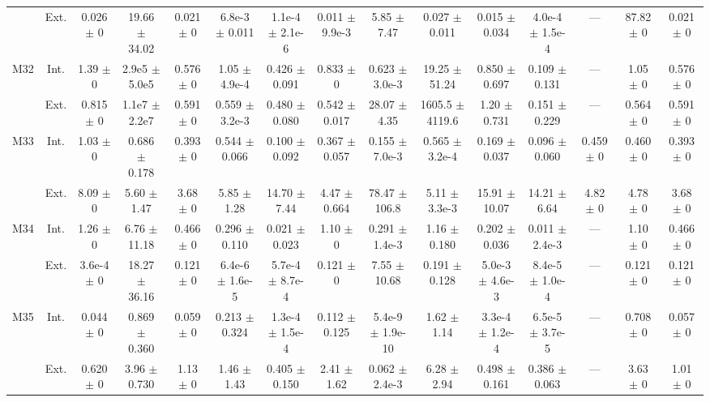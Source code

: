 \begin{table}[htbp]
{\begin{tabular}{@{}ccccccccccccccc@{}}
 & Ext. & 0.026 $\pm$ 0 & 19.66 $\pm$ 34.02 & 0.021 $\pm$ 0 & 6.8e-3 $\pm$ 0.011 & 1.1e-4 $\pm$ 2.1e-6 & 0.011 $\pm$ 9.9e-3 & 5.85 $\pm$ 7.47 & 0.027 $\pm$ 0.011 & 0.015 $\pm$ 0.034 & 4.0e-4 $\pm$ 1.5e-4 & --- & 87.82 $\pm$ 0 & 0.021 $\pm$ 0 \\
\cline{2-15}
\multirow{2}{*}{M32} & Int. & 1.39 $\pm$ 0 & 2.9e5 $\pm$ 5.0e5 & 0.576 $\pm$ 0 & 1.05 $\pm$ 4.9e-4 & 0.426 $\pm$ 0.091 & 0.833 $\pm$ 0 & 0.623 $\pm$ 3.0e-3 & 19.25 $\pm$ 51.24 & 0.850 $\pm$ 0.697 & 0.109 $\pm$ 0.131 & --- & 1.05 $\pm$ 0 & 0.576 $\pm$ 0 \\
 & Ext. & 0.815 $\pm$ 0 & 1.1e7 $\pm$ 2.2e7 & 0.591 $\pm$ 0 & 0.559 $\pm$ 3.2e-3 & 0.480 $\pm$ 0.080 & 0.542 $\pm$ 0.017 & 28.07 $\pm$ 4.35 & 1605.5 $\pm$ 4119.6 & 1.20 $\pm$ 0.731 & 0.151 $\pm$ 0.229 & --- & 0.564 $\pm$ 0 & 0.591 $\pm$ 0 \\
\cline{2-15}
\multirow{2}{*}{M33} & Int. & 1.03 $\pm$ 0 & 0.686 $\pm$ 0.178 & 0.393 $\pm$ 0 & 0.544 $\pm$ 0.066 & 0.100 $\pm$ 0.092 & 0.367 $\pm$ 0.057 & 0.155 $\pm$ 7.0e-3 & 0.565 $\pm$ 3.2e-4 & 0.169 $\pm$ 0.037 & 0.096 $\pm$ 0.060 & 0.459 $\pm$ 0 & 0.460 $\pm$ 0 & 0.393 $\pm$ 0 \\
 & Ext. & 8.09 $\pm$ 0 & 5.60 $\pm$ 1.47 & 3.68 $\pm$ 0 & 5.85 $\pm$ 1.28 & 14.70 $\pm$ 7.44 & 4.47 $\pm$ 0.664 & 78.47 $\pm$ 106.8 & 5.11 $\pm$ 3.3e-3 & 15.91 $\pm$ 10.07 & 14.21 $\pm$ 6.64 & 4.82 $\pm$ 0 & 4.78 $\pm$ 0 & 3.68 $\pm$ 0 \\
\cline{2-15}
\multirow{2}{*}{M34} & Int. & 1.26 $\pm$ 0 & 6.76 $\pm$ 11.18 & 0.466 $\pm$ 0 & 0.296 $\pm$ 0.110 & 0.021 $\pm$ 0.023 & 1.10 $\pm$ 0 & 0.291 $\pm$ 1.4e-3 & 1.16 $\pm$ 0.180 & 0.202 $\pm$ 0.036 & 0.011 $\pm$ 2.4e-3 & --- & 1.10 $\pm$ 0 & 0.466 $\pm$ 0 \\
 & Ext. & 3.6e-4 $\pm$ 0 & 18.27 $\pm$ 36.16 & 0.121 $\pm$ 0 & 6.4e-6 $\pm$ 1.6e-5 & 5.7e-4 $\pm$ 8.7e-4 & 0.121 $\pm$ 0 & 7.55 $\pm$ 10.68 & 0.191 $\pm$ 0.128 & 5.0e-3 $\pm$ 4.6e-3 & 8.4e-5 $\pm$ 1.0e-4 & --- & 0.121 $\pm$ 0 & 0.121 $\pm$ 0 \\
\cline{2-15}
\multirow{2}{*}{M35} & Int. & 0.044 $\pm$ 0 & 0.869 $\pm$ 0.360 & 0.059 $\pm$ 0 & 0.213 $\pm$ 0.324 & 1.3e-4 $\pm$ 1.5e-4 & 0.112 $\pm$ 0.125 & 5.4e-9 $\pm$ 1.9e-10 & 1.62 $\pm$ 1.14 & 3.3e-4 $\pm$ 1.2e-4 & 6.5e-5 $\pm$ 3.7e-5 & --- & 0.708 $\pm$ 0 & 0.057 $\pm$ 0 \\
 & Ext. & 0.620 $\pm$ 0 & 3.96 $\pm$ 0.730 & 1.13 $\pm$ 0 & 1.46 $\pm$ 1.43 & 0.405 $\pm$ 0.150 & 2.41 $\pm$ 1.62 & 0.062 $\pm$ 2.4e-3 & 6.28 $\pm$ 2.94 & 0.498 $\pm$ 0.161 & 0.386 $\pm$ 0.063 & --- & 3.63 $\pm$ 0 & 1.01 $\pm$ 0 \\

\end{tabular}}
\end{table}
